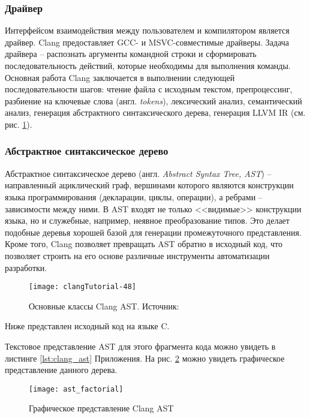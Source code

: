 \subsubsection{Драйвер}
Интерфейсом взаимодействия между пользователем и компилятором является драйвер.
Clang предоставляет GCC- и MSVC-совместимые драйверы. Задача драйвера --
распознать аргументы командной строки и сформировать последовательность действий,
которые необходимы для выполнения команды. Основная работа Clang заключается
в выполнении следующей последовательности шагов: чтение файла с исходным текстом,
препроцессинг, разбиение на ключевые слова (англ. \textit{tokens}), лексический
анализ, семантический анализ, генерация абстрактного синтаксического дерева,
генерация LLVM IR (см. рис. \ref{fig:clang_core}).

\subsubsection{Абстрактное синтаксическое дерево}
Абстрактное синтаксическое дерево (англ. \textit{Abstract Syntax Tree, AST}) --
направленный ациклический граф, вершинами которого являются конструкции языка 
программирования (декларации, циклы, операции), а ребрами -- зависимости между
ними. В AST входят не только <<видимые>> конструкции языка, но и служебные,
например, неявное преобразование типов. Это делает подобные деревья хорошей
базой для генерации промежуточного представления. Кроме того, Clang позволяет
превращать AST обратно в исходный код, что позволяет строить на его основе
различные инструменты автоматизации разработки.
\begin{figure}[h]
  \centering
  \texttt{[image: clangTutorial-48]}
  \caption{Основные классы Clang AST. Источник: \cite{VanHaagstretSvenARMandStulova2019}}
  \label{fig:clang_core}
\end{figure}

Ниже представлен исходный код на языке C.

Текстовое представление AST для этого фрагмента кода можно увидеть в листинге
\ref{lst:clang_ast} Приложения. На рис. \ref{fig:clang_ast} можно увидеть
графическое представление данного дерева.

\begin{figure}[h]
  \centering
  \texttt{[image: ast\_factorial]}
  \caption{Графическое представление Clang AST} 
  \label{fig:clang_ast}
\end{figure}

